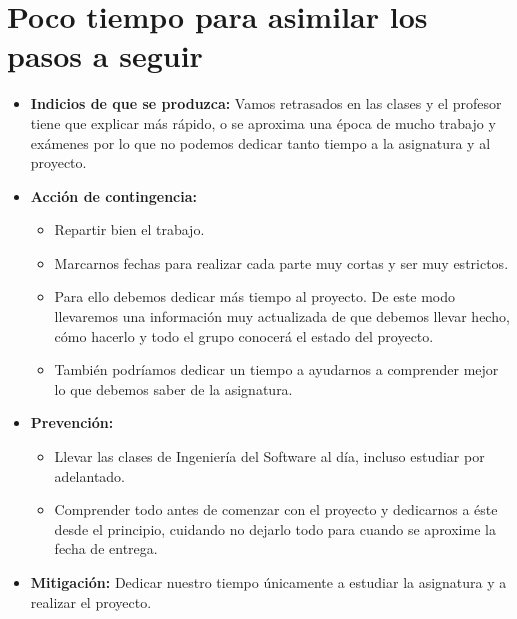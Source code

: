 \documentclass[spanish,a4paper,11pt, twoside]{report}	%
\begin{document}
	\section{Poco tiempo para asimilar los pasos a seguir}
		\begin{itemize}
			\item \textbf {Indicios de que se produzca: }Vamos retrasados en las clases y el
			profesor tiene que explicar más rápido, o se aproxima una época de mucho trabajo
			y exámenes por lo que no podemos dedicar tanto tiempo a la asignatura y al
			proyecto.
			\item \textbf {Acción de contingencia: }
				\begin{itemize}
				  \item Repartir bien el trabajo.
				  \item Marcarnos fechas para realizar cada parte muy cortas y ser muy estrictos. 
				  \item Para ello debemos dedicar más tiempo al proyecto. De este modo llevaremos una información
						muy actualizada de que debemos llevar hecho, cómo hacerlo y todo el grupo
						conocerá el estado del proyecto. 
				  \item También podríamos dedicar un tiempo a ayudarnos
						a comprender mejor lo que debemos saber de la asignatura.
				\end{itemize}
			\item \textbf {Prevención: }
				\begin{itemize}
				  \item Llevar las clases de Ingeniería del Software al día, incluso estudiar por adelantado. 
				  \item Comprender todo antes de comenzar con el
						proyecto y dedicarnos a éste desde el principio, cuidando no dejarlo todo para
						cuando se aproxime la fecha de entrega.  %
				\end{itemize}
			\item \textbf {Mitigación: }Dedicar nuestro tiempo únicamente a estudiar la
			asignatura y a realizar el proyecto.
		\end{itemize}

	
\end{document}
